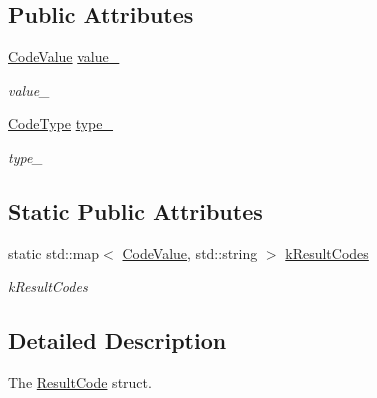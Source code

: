 \subsection*{Public Attributes}
\begin{DoxyCompactItemize}
\item 
\hyperlink{structdata__model_1_1_result_code_a57c4d467974a51fc8475b9fd2b4ed505}{Code\+Value} \hyperlink{structdata__model_1_1_result_code_a497bd5f6f8f5034bf2d8f48ff46a0e18}{value\+\_\+}\hypertarget{structdata__model_1_1_result_code_a497bd5f6f8f5034bf2d8f48ff46a0e18}{}\label{structdata__model_1_1_result_code_a497bd5f6f8f5034bf2d8f48ff46a0e18}

\begin{DoxyCompactList}\small\item\em value\+\_\+ \end{DoxyCompactList}\item 
\hyperlink{structdata__model_1_1_result_code_ae2d78d99add6ff3727da0474572464fd}{Code\+Type} \hyperlink{structdata__model_1_1_result_code_a9aa8ab86645c3b2c62bbc2c356903072}{type\+\_\+}\hypertarget{structdata__model_1_1_result_code_a9aa8ab86645c3b2c62bbc2c356903072}{}\label{structdata__model_1_1_result_code_a9aa8ab86645c3b2c62bbc2c356903072}

\begin{DoxyCompactList}\small\item\em type\+\_\+ \end{DoxyCompactList}\end{DoxyCompactItemize}
\subsection*{Static Public Attributes}
\begin{DoxyCompactItemize}
\item 
static std\+::map$<$ \hyperlink{structdata__model_1_1_result_code_a57c4d467974a51fc8475b9fd2b4ed505}{Code\+Value}, std\+::string $>$ \hyperlink{structdata__model_1_1_result_code_adba7e4beae8cd77b2c9cc807d77f0b19}{k\+Result\+Codes}
\begin{DoxyCompactList}\small\item\em k\+Result\+Codes \end{DoxyCompactList}\end{DoxyCompactItemize}


\subsection{Detailed Description}
The \hyperlink{structdata__model_1_1_result_code}{Result\+Code} struct. 

